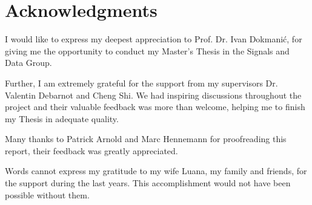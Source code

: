 \chapter{Acknowledgments}

I would like to express my deepest appreciation to Prof. Dr. Ivan Dokmanić,
for giving me the opportunity to conduct my Master's Thesis in the 
Signals and Data Group.

\bigskip

Further, I am extremely grateful for the support from my supervisors
Dr. Valentin Debarnot and Cheng Shi. We had inspiring discussions
throughout the project and their valuable feedback was more than welcome,
helping me to finish my Thesis in adequate quality.

\bigskip
Many thanks to Patrick Arnold and Marc Hennemann for 
proofreading this report, their feedback was greatly appreciated.

\bigskip
Words cannot express my gratitude to my wife Luana, my family and friends,
for the support during the last years.
This accomplishment would not have been possible without them.